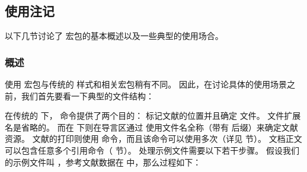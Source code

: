 \subsection{使用注记}%
\label{use:use}


以下几节讨论了 \biblatex 宏包的基本概述以及一些典型的使用场合。

\subsubsection{概述}%
\label{use:use:int}


使用 \biblatex 宏包与传统的 \BibTeX 样式和相关宏包稍有不同。
因此，在讨论具体的使用场景之前，我们首先要看一下典型的文件结构：

%
在传统的 \BibTeX 下， 命令提供了两个目的：
标记文献的位置并且确定  文件。
文件扩展名是省略的。
而在 \biblatex 下则在导言区通过  使用文件名全称（带有  后缀）来确定文献资源。
文献的打印则使用  命令，而且该命令可以使用多次（详见  节）。
文档正文可以包含任意多个引用命令（ 节）。
处理示例文件需要以下若干步骤。
假设我们的示例文件叫 ，参考文献数据在  中，那么过程如下：

